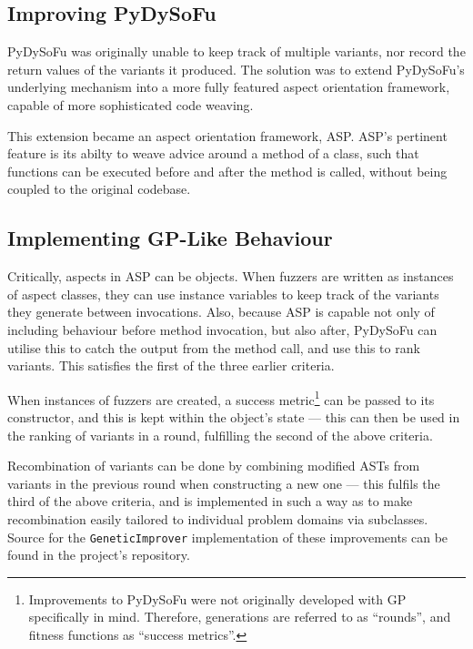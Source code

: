 \documentclass[12pt]{llncs} %
\begin{document}
\subsection{Improving PyDySoFu}
PyDySoFu was originally unable to keep track of multiple variants, nor record
the return values of the variants it produced. The solution was to extend
PyDySoFu's underlying mechanism into a more fully featured aspect orientation
framework, capable of more sophisticated code weaving.\par

This extension became an aspect orientation framework, ASP\cite{asp}. ASP's
pertinent feature is its abilty to weave advice around a method of a class, such
that functions can be executed before and after the method is called, without
being coupled to the original codebase.\par 

\subsection{Implementing GP-Like Behaviour}
Critically, aspects in ASP can be objects. When fuzzers are written as instances
of aspect classes, they can use instance variables to keep track of the variants
they generate between invocations. Also, because ASP is capable not only of
including behaviour before method invocation, but also after, PyDySoFu can
utilise this to catch the output from the method call, and use this to rank
variants. This satisfies the first of the three earlier criteria.\par

When instances of fuzzers are created, a success metric\footnote{Improvements to
  PyDySoFu were not originally developed with GP specifically in mind.
  Therefore, generations are referred to as ``rounds'', and fitness functions as
  ``success metrics''.} can be passed to its constructor, and this is
kept within the object's state --- this can then be used in the ranking of
variants in a round, fulfilling the second of the above criteria.\par

Recombination of variants can be done by combining modified ASTs from variants
in the previous round when constructing a new one --- this fulfils the third of
the above criteria, and is implemented in such a way as to make recombination
easily tailored to individual problem domains via subclasses. Source for the
\texttt{GeneticImprover} implementation of these improvements can be found in
the project's repository\cite{pydysofu}.\par
\end{document}
